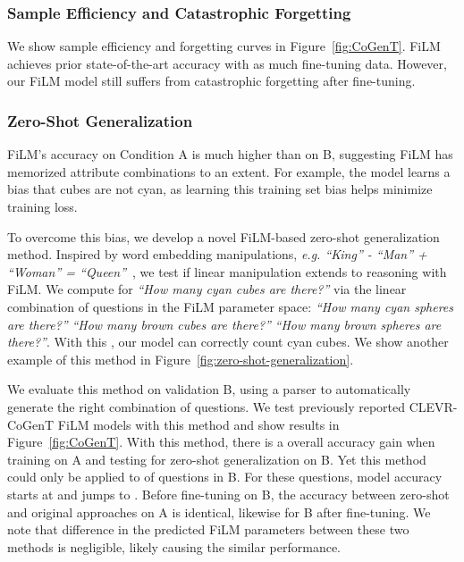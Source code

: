 \documentclass[letterpaper]{article} \usepackage{aaai18}  \usepackage{times}  \usepackage{helvet}  \usepackage{courier}  \usepackage{url}  \usepackage{graphicx}  \frenchspacing  \setlength{\pdfpagewidth}{8.5in}  \setlength{\pdfpageheight}{11in}
\begin{document}
		\subsubsection{Sample Efficiency and Catastrophic Forgetting} We show sample efficiency and forgetting curves in Figure~\ref{fig:CoGenT}. FiLM achieves prior state-of-the-art accuracy with  as much fine-tuning data. However, our FiLM model still suffers from catastrophic forgetting after fine-tuning.
        
		\subsubsection{Zero-Shot Generalization}
        
		FiLM's accuracy on Condition A is much higher than on B, suggesting FiLM has memorized attribute combinations to an extent. For example, the model learns a bias that cubes are not cyan, as learning this training set bias helps minimize training loss.

    	To overcome this bias, we develop a novel FiLM-based zero-shot generalization method. Inspired by word embedding manipulations, \textit{e.g. ``King'' - ``Man'' + ``Woman'' = ``Queen''}~\cite{mikolov2013distributed}, we test if linear manipulation extends to reasoning with FiLM. We compute  for \textit{``How many cyan cubes are there?''} via the linear combination of questions in the FiLM parameter space: \textit{``How many cyan spheres are there?''}  \textit{``How many brown cubes are there?''}  \textit{``How many brown spheres are there?''}. With this , our model can correctly count cyan cubes. We show another example of this method in Figure~\ref{fig:zero-shot-generalization}.
    
We evaluate this method on validation B, using a parser to automatically generate the right combination of questions. We test previously reported CLEVR-CoGenT FiLM models with this method and show results in Figure~\ref{fig:CoGenT}. With this method, there is a  overall accuracy gain when training on A and testing for zero-shot generalization on B. Yet this method could only be applied to  of questions in B. For these questions, model accuracy starts at  and jumps to . Before fine-tuning on B, the accuracy between zero-shot and original approaches on A is identical, likewise for B after fine-tuning. We note that difference in the predicted FiLM parameters between these two methods is negligible, likely causing the similar performance.
    
\end{document}
